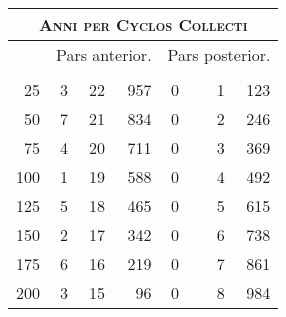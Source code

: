 %
\begin{tabnums} %
\footnotesize
\centering
\setlength{\tabcolsep}{1.0ex}
\renewcommand{\arraystretch}{0.95}
%
\newcommand{\cwd}{3.2em}
\newcommand{\da}{{\tiny †}}
\newcommand{\db}{{\scriptsize o}}
\newcommand{\ang}{90}
\newcommand{\hsb}[1]{\footnotesize{#1}}
\newcommand{\hsa}[1]{\tiny{#1}}
%
\newcommand{\hdrB}{%
  ~ &
  \multicolumn{3}{c}{\hsb{Pars anterior.}} &
  \multicolumn{4}{c}{\hsb{Pars posterior.}}  
}
%
\newcommand{\hdrA}{%
  \ch{\hsa{Anni per}}{\hsa{Anni per cyclos collecti.}} &
  \ch{\hsa{Feria.}}{\hsa{Feria.}}&
  \ch{\hsa{Hor.}}{\hsa{Hor.}} &
  \ch{\hsa{Scrup.}}{\hsa{Scrup.}} &
  \ch{\hsa{Dies.}}{\hsa{Dies.}} & & %
  \ch{\hsa{Hor.}}{\hsa{Hor.}} &
  \ch{\hsa{Scrup.}}{\hsa{Scrup.}}
}
%
\newcommand{\hdrs}{%
\hdrB \\
\cmidrule(lr){2-4} \cmidrule(lr){5-8}
\hdrA \\
}
%
\begin{tabular}[c]{@{} r rrr r@{}lrr @{}}
\toprule
\multicolumn{8}{c}{\normalsize\textsc{Anni per Cyclos Collecti}} \\
\toprule
\hdrs %
\midrule
  25 & 3 & 22 &  957 & 0&&  1 &  123 \\
  50 & 7 & 21 &  834 & 0&&  2 &  246 \\
  75 & 4 & 20 &  711 & 0&&  3 &  369 \\
 100 & 1 & 19 &  588 & 0&&  4 &  492 \\
 125 & 5 & 18 &  465 & 0&&  5 &  615 \\
 150 & 2 & 17 &  342 & 0&&  6 &  738 \\
 175 & 6 & 16 &  219 & 0&&  7 &  861 \\
 200 & 3 & 15 &   96 & 0&&  8 &  984 \\

\end{tabular}
\end{tabnums}
